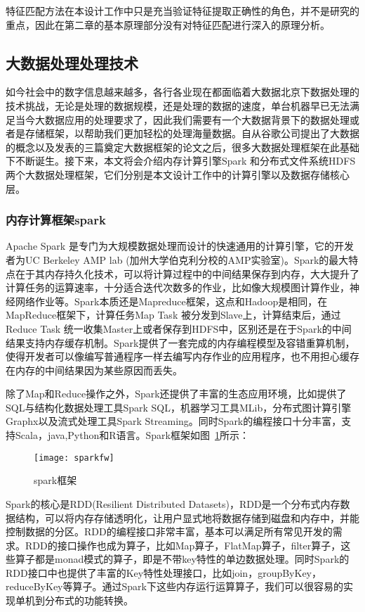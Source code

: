特征匹配方法在本设计工作中只是充当验证特征提取正确性的角色，并不是研究的重点，因此在第二章的基本原理部分没有对特征匹配进行深入的原理分析。

\subsection{大数据处理处理技术}
如今社会中的数字信息越来越多，各行各业现在都面临着大数据北京下数据处理的技术挑战，无论是处理的数据规模，还是处理的数据的速度，单台机器早已无法满足当今大数据应用的处理要求了，因此我们需要有一个大数据背景下的数据处理或者是存储框架，以帮助我们更加轻松的处理海量数据。自从谷歌公司提出了大数据的概念以及发表的三篇奠定大数据框架的论文之后，很多大数据处理框架在此基础下不断诞生。接下来，本文将会介绍内存计算引擎Spark 和分布式文件系统HDFS 两个大数据处理框架，它们分别是本文设计工作中的计算引擎以及数据存储核心层。
\subsubsection{内存计算框架spark}
Apache Spark 是专门为大规模数据处理而设计的快速通用的计算引擎，它的开发者为UC Berkeley AMP lab (加州大学伯克利分校的AMP实验室)。Spark的最大特点在于其内存持久化技术，可以将计算过程中的中间结果保存到内存，大大提升了计算任务的运算速率，十分适合迭代次数多的作业，比如像大规模图计算作业，神经网络作业等。Spark本质还是Mapreduce框架，这点和Hadoop是相同，在MapReduce框架下，计算任务Map Task 被分发到Slave上，计算结束后，通过Reduce Task 统一收集Master上或者保存到HDFS中，区别还是在于Spark的中间结果支持内存缓存机制。Spark提供了一套完成的内存编程模型及容错重算机制，使得开发者可以像编写普通程序一样去编写内存作业的应用程序，也不用担心缓存在内存的中间结果因为某些原因而丢失。

除了Map和Reduce操作之外，Spark还提供了丰富的生态应用环境，比如提供了SQL与结构化数据处理工具Spark SQL，机器学习工具MLib，分布式图计算引擎Graphx以及流式处理工具Spark Streaming。同时Spark的编程接口十分丰富，支持Scala，java,Python和R语言。Spark框架如图~\ref{fig:sparkfw}所示：
\begin{figure}[htp]
\centering
\texttt{[image: sparkfw]}
\caption{spark框架}
\label{fig:sparkfw}
\end{figure}

Spark的核心是RDD(Resilient Distributed Datasets)，RDD是一个分布式内存数据结构，可以将内存存储透明化，让用户显式地将数据存储到磁盘和内存中，并能控制数据的分区。RDD的编程接口非常丰富，基本可以满足所有常见开发的需求。RDD的接口操作也成为算子，比如Map算子，FlatMap算子，filter算子，这些算子都是monad模式的算子，即是不带key特性的单边数据处理。同时Spark的RDD接口中也提供了丰富的Key特性处理接口，比如join，groupByKey，reduceByKey等算子。通过Spark下这些内存运行运算算子，我们可以很容易的实现单机到分布式的功能转换。

